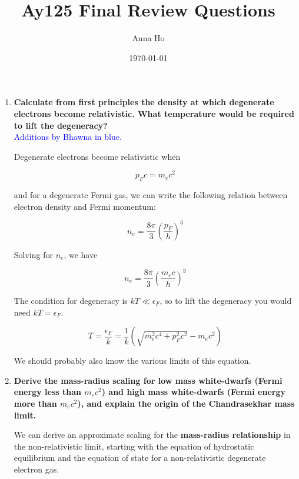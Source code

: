 \documentclass[a4paper]{article}
\title{Ay125 Final Review Questions}
\author{Anna Ho}
\date{\today}
\begin{document}
\maketitle

\begin{enumerate}

\item \textbf{Calculate from first principles the density at which degenerate electrons become relativistic. What temperature would be required to lift the degeneracy?} \\

\textcolor{blue}{Additions by Bhawna in blue.}

Degenerate electrons become relativistic when 

\begin{equation}
p_F c = m_e c^2
\end{equation}

and for a degenerate Fermi gas, we can write the following relation between electron density and Fermi momentum:

\begin{equation}
n_e = \frac{8 \pi}{3} \left( \frac{p_F}{h} \right)^3
\end{equation}

Solving for $n_e$, we have

\begin{equation}
n_e = \frac{8 \pi}{3} \left( \frac{m_e c}{h} \right)^3
\end{equation}

The condition for degeneracy is $kT \ll \epsilon_F$, so to lift the degeneracy you would need $kT = \epsilon_F$. 

\begin{equation}
T = \frac{\epsilon_F}{k} = \frac{1}{k} \left( \sqrt{m_e^2 c^4 + p_F^2 c^2} - m_e c^2 \right)
\end{equation}

We should probably also know the various limits of this equation. \newline

\item \textbf{Derive the mass-radius scaling for low mass white-dwarfs (Fermi energy less than $m_e c^2$) and high mass white-dwarfs (Fermi energy more than $m_e c^2$), and explain the origin of the Chandrasekhar mass limit.} \newline

We can derive an approximate scaling for the \textbf{mass-radius relationship} in the non-relativistic limit, starting with the equation of hydrostatic equilibrium and the equation of state for a non-relativistic degenerate electron gas.


\end{enumerate}
\end{document}
